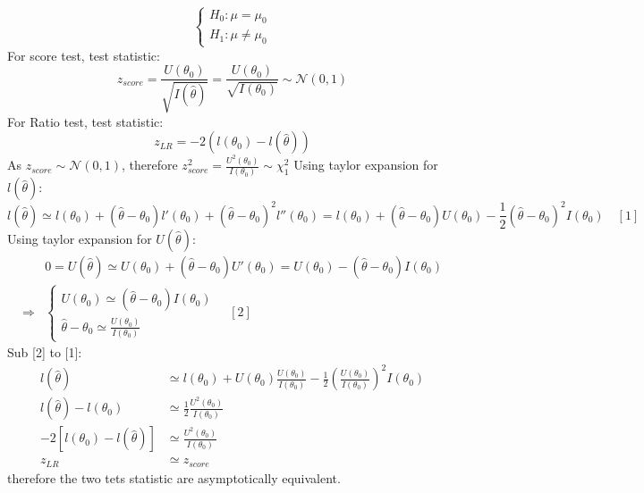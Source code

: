 \documentclass[a4paper]{article}
\begin{document}
		\newpage
		\subsection{}
			\[\begin{cases}
				H_0:\mu = \mu_0\\
				H_1:\mu \neq \mu_0
			\end{cases}\]
			For score test, test statistic:
				\[z_{score}=\frac{U(\theta_0)}{\sqrt{I(\hat{\theta})}}=\frac{U(\theta_0)}{\sqrt{I(\theta_0)}} \sim \mathcal{N}(0,1)\]
			For Ratio test, test statistic:
				\[z_{LR} = -2\left(l(\theta_0)-l(\hat{\theta})\right)\]
			As \(z_{score}\sim\mathcal{N}(0,1)\), therefore \(z_{score}^2 = \frac{U^2(\theta_0)}{I(\theta_0)}\sim \chi_1^2\)
			Using taylor expansion for \(l(\hat{\theta})\):
				\[l(\hat{\theta}) \simeq l(\theta_0) + (\hat{\theta}-\theta_0)l'(\theta_0) + (\hat{\theta}-\theta_0)^2 l''(\theta_0) = l(\theta_0) + (\hat{\theta}-\theta_0)U(\theta_0) - \frac{1}{2}(\hat{\theta}-\theta_0)^2 I(\theta_0)\quad [1]\]
			Using taylor expansion for \(U(\hat{\theta})\):
				\begin{equation*}
					\begin{split}
						& 0 = U(\hat{\theta}) \simeq U(\theta_0) + (\hat{\theta}-\theta_0)U'(\theta_0) = U(\theta_0) - (\hat{\theta}-\theta_0)I(\theta_0)\\
						\Rightarrow & \begin{cases}
							U(\theta_0) \simeq (\hat{\theta}-\theta_0)I(\theta_0)\\
							\hat{\theta} -\theta_0 \simeq \frac{U(\theta_0)}{I(\theta_0)}
						\end{cases} \quad [2]
					\end{split}
				\end{equation*}
			Sub [2] to [1]:
				\begin{equation*}
					\begin{split}
						l(\hat{\theta}) &\simeq l(\theta_0) + U(\theta_0)\frac{U(\theta_0)}{I(\theta_0)} - \frac{1}{2} \left(\frac{U(\theta_0)}{I(\theta_0)}\right)^2I(\theta_0)\\
						l(\hat{\theta}) - l(\theta_0) &\simeq \frac{1}{2} \frac{U^2(\theta_0)}{I(\theta_0)}\\
						-2\left[l(\theta_0) - l(\hat{\theta})\right] &\simeq \frac{U^2(\theta_0)}{I(\theta_0)}\\
						z_{LR} &\simeq z_{score}
					\end{split}
				\end{equation*}
			therefore the two tets statistic are asymptotically equivalent.
\end{document}
